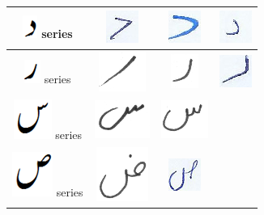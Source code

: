 \begin{table}[h]
\begin{tabular}{@{}cccc@{}}
\hline
\includegraphics[scale=0.25]{daal_orig} series & \includegraphics[scale=0.15]{daal_2} & \includegraphics[scale=0.15]{daal_3}  & \includegraphics[scale=0.15]{daal_4} \\
\hline
\includegraphics[scale=0.25]{re_orig} series & \includegraphics[scale=0.15]{raay} & \includegraphics[scale=0.15]{raay2}  & \includegraphics[scale=0.15]{re_1} \\
\hline
\includegraphics[scale=0.25]{seen_orig} series & \includegraphics[scale=0.15]{seen} & \includegraphics[scale=0.15]{seen2}  &  \\
\hline
\includegraphics[scale=0.20]{suad_orig} series & \includegraphics[scale=0.15]{zuwad2} & \includegraphics[scale=0.15]{suad_4}  &  \\

\end{tabular}
\end{table}
